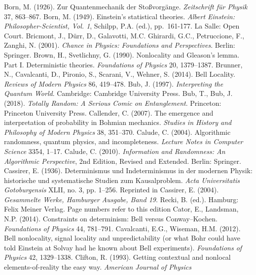 \documentclass[11pt,a4paper]{article}
\numberwithin{equation}{section}
\begin{document}
\begin{small}
\begin{thebibliography}{99}
 \bibitem{}  Born, M. (1926). Zur Quantenmechanik der Sto\ss vorg\"{a}nge. \emph{Zeitschrift f\"{u}r Physik}  37, 863--867. 
  \bibitem{}  Born, M. (1949). Einstein's statistical theories. \emph{Albert Einstein: Philosopher-Scientist, Vol. 1}, 
Schilpp, P.A. (ed.), pp.\ 161-177.  La Salle: Open Court. 
    \bibitem{}  Bricmont, J.,  D\"{u}rr, D.,  Galavotti, M.C.  Ghirardi, G.C.,   Petruccione, F.,   Zanghi, N. (2001).
    \emph{Chance in Physics: Foundations and Perspectives}. Berlin: Springer. 
    \bibitem{} 
Brown, H.,  Svetlichny, G. (1990).
Nonlocality and Gleason's lemma. Part I. Deterministic theories. \emph{Foundations of Physics} 20, 1379--1387.
\bibitem{}   Brunner, N., Cavalcanti, D.,  Pironio, S.,  Scarani, V., Wehner, S. (2014). Bell Locality.  \emph{Reviews of Modern Physics} 86, 419--478.
\bibitem{}
 Bub, J. (1997).  \emph{Interpreting the Quantum World}. Cambridge: Cambridge University Press.
\bibitem{} Bub, T., Bub, J. (2018). \emph{Totally Random: A Serious Comic on Entanglement}. Princeton: Princeton University Press.
\bibitem{} Callender, C. (2007). The emergence and interpretation of probability in
Bohmian mechanics.  \emph{Studies in History and Philosophy of Modern Physics} 38, 351--370. 
\bibitem{}  Calude, C. (2004). Algorithmic randomness, quantum physics, and incompleteness. \emph{Lecture Notes in Computer Science} 3354,  1--17.
\bibitem{}  Calude, C. (2010). \emph{Information and Randomness: An Algorithmic Perspective}, 2nd Edition, Revised and Extended. Berlin: Springer. 
\bibitem{} Cassirer, E. (1936). Determinismus und Indeterminismus in der modernen Physik: historische und systematische Studien zum Kausalproblem. \emph{Acta Universitatis Gotoburgensis} XLII, no. 3, pp. 1--256. Reprinted in Cassirer, E. (2004).
\emph{Gesammelte Werke, Hamburger Ausgabe, Band 19}. Recki, B. (ed.). Hamburg: 
Felix Meiner Verlag.  Page numbers refer to this edition
  \bibitem{}
  Cator, E.,  Landsman, N.P. (2014). Constraints on determinism: Bell versus Conway--Kochen.
  \emph{Foundations of Physics} 44, 781--791. 
  \bibitem{}  Cavalcanti, E.G.,  Wiseman, H.M. (2012). Bell nonlocality, signal locality and unpredictability (or what Bohr could have told Einstein at Solvay had he known about Bell experiments).
   \emph{Foundations of Physics} 42, 1329--1338.
   \bibitem{}
 Clifton, R. (1993).
 Getting contextual and nonlocal elements-of-reality the easy way. \emph{American Journal of Physics}

\end{thebibliography}
\end{small}
\end{document}
